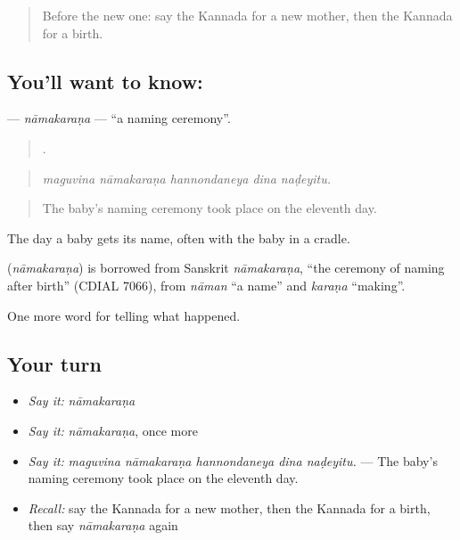 \label{lesson:KA-C334-namakarana}



\begin{quote}
Before the new one: say the Kannada for a new mother, then the Kannada for a birth.
\end{quote}

\subsection*{You'll want to know: }
\textbf{} — \emph{nāmakaraṇa} — \textquotedblleft{}a naming ceremony\textquotedblright{}.

\begin{quote}
    .
\end{quote}

\begin{quote}
\emph{maguvina nāmakaraṇa hannondaneya dina naḍeyitu.}
\end{quote}

\begin{quote}
The baby's naming ceremony took place on the eleventh day.
\end{quote}

The day a baby gets its name, often with the baby in a cradle.

\begin{cousinweb}
\textbf{} (\emph{nāmakaraṇa}) is borrowed from Sanskrit \emph{nāmakaraṇa}, \textquotedblleft{}the ceremony of naming after birth\textquotedblright{} (CDIAL 7066), from \emph{nāman} \textquotedblleft{}a name\textquotedblright{} and \emph{karaṇa} \textquotedblleft{}making\textquotedblright{}.
\end{cousinweb}

\begin{grammarlens}[title={What you've built}]
One more word for telling what happened.
\end{grammarlens}

\subsection*{Your turn}
\begin{itemize}
\raggedright
  \item \emph{Say it:} \emph{nāmakaraṇa}
  \item \emph{Say it:} \emph{nāmakaraṇa}, once more
  \item \emph{Say it:} \emph{maguvina nāmakaraṇa hannondaneya dina naḍeyitu.} — The baby's naming ceremony took place on the eleventh day.
  \item \emph{Recall:} say the Kannada for a new mother, then the Kannada for a birth, then say \emph{nāmakaraṇa} again
\end{itemize}

